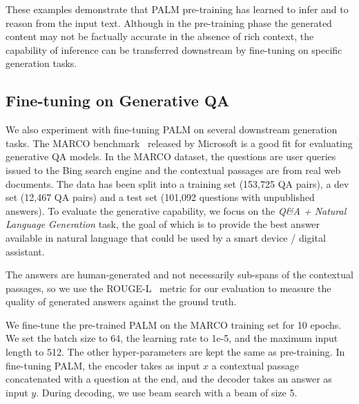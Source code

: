 \documentclass[11pt,a4paper]{article}
\newcommand{\method}{PALM\xspace}
\begin{document}
These examples demonstrate that \method pre-training has learned to infer and to reason from the input text. Although in the pre-training phase the generated content may not be factually accurate in the absence of rich context, the capability of inference can be transferred downstream by fine-tuning on specific generation tasks.

\subsection{Fine-tuning on Generative QA}
We also experiment with fine-tuning \method on several downstream generation tasks. The MARCO benchmark~\cite{Nguyen:2016} released by Microsoft is a good fit for evaluating generative QA models. In the MARCO dataset, the questions are user queries issued to the Bing search engine and the contextual passages are from real web documents. The data has been split into a training set (153,725 QA pairs), a dev set (12,467 QA pairs) and a test set (101,092 questions with unpublished answers). To evaluate the generative capability, we focus on the \emph{Q\&A + Natural Language Generation} task, the goal of which is to provide the best answer available in natural language that could be used by a smart device / digital assistant.

The answers are human-generated and not necessarily sub-spans of the contextual passages, so we use the ROUGE-L~\cite{Lin:2004} metric for our evaluation to measure the quality of generated answers against the ground truth.

We fine-tune the pre-trained \method on the MARCO training set for 10 epochs. We set the batch size to 64, the learning rate to 1e-5, and the maximum input length to 512. The other hyper-parameters are kept the same as pre-training. In fine-tuning \method, the encoder takes as input $x$ a contextual passage concatenated with a question at the end, and the decoder takes an answer as input $y$. During decoding, we use beam search with a beam of size 5.
\end{document}
